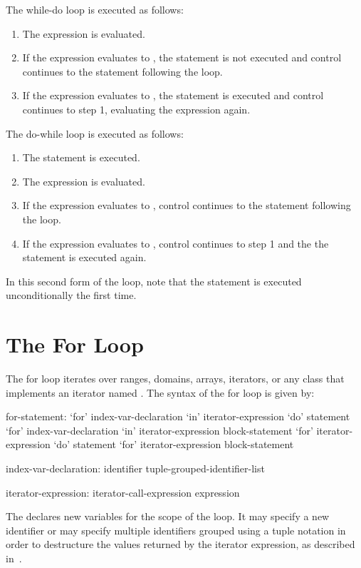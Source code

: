 The while-do loop is executed as follows:
\begin{enumerate}
\item The expression is evaluated.
\item If the expression evaluates to , the statement is
  not executed and control continues to the statement following the
  loop.
\item If the expression evaluates to , the statement is
  executed and control continues to step 1, evaluating the expression
  again.
\end{enumerate}

The do-while loop is executed as follows:
\begin{enumerate}
\item The statement is executed.
\item The expression is evaluated.
\item If the expression evaluates to , control continues
  to the statement following the loop.
\item If the expression evaluates to , control continues to
  step 1 and the the statement is executed again.
\end{enumerate}
In this second form of the loop, note that the statement is executed
unconditionally the first time.

\section{The For Loop}
\label{The_For_Loop}


The for loop iterates over ranges, domains, arrays, iterators, or any
class that implements an iterator named .  The syntax of
the for loop is given by:
\begin{syntax}
for-statement:
  `for' index-var-declaration `in' iterator-expression `do' statement
  `for' index-var-declaration `in' iterator-expression block-statement
  `for' iterator-expression `do' statement
  `for' iterator-expression block-statement

index-var-declaration:
  identifier
  tuple-grouped-identifier-list

iterator-expression:
  iterator-call-expression
  expression
\end{syntax}

The  declares new variables for the scope
of the loop.  It may specify a new identifier or may specify multiple
identifiers grouped using a tuple notation in order to destructure the
values returned by the iterator expression, as described
in~.


